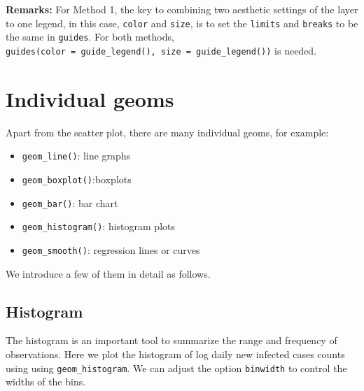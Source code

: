 \documentclass[]{book}
\newenvironment{Shaded}{\begin{snugshade}}{\end{snugshade}}
\newcommand{\KeywordTok}[1]{\textcolor[rgb]{0.13,0.29,0.53}{\textbf{#1}}}
\newcommand{\DataTypeTok}[1]{\textcolor[rgb]{0.13,0.29,0.53}{#1}}
\newcommand{\DecValTok}[1]{\textcolor[rgb]{0.00,0.00,0.81}{#1}}
\newcommand{\StringTok}[1]{\textcolor[rgb]{0.31,0.60,0.02}{#1}}
\newcommand{\CommentTok}[1]{\textcolor[rgb]{0.56,0.35,0.01}{\textit{#1}}}
\newcommand{\OperatorTok}[1]{\textcolor[rgb]{0.81,0.36,0.00}{\textbf{#1}}}
\newcommand{\NormalTok}[1]{#1}
\providecommand{\tightlist}{%
  \setlength{\itemsep}{0pt}\setlength{\parskip}{0pt}}
\begin{document}
\textbf{Remarks:} For Method 1, the key to combining two aesthetic
settings of the layer to one legend, in this case, \texttt{color} and
\texttt{size}, is to set the \texttt{limits} and \texttt{breaks} to be
the same in \texttt{guides}. For both methods,
\texttt{guides(color\ =\ guide\_legend(),\ size\ =\ guide\_legend())} is
needed.

\section{Individual geoms}\label{individual-geoms}

Apart from the scatter plot, there are many individual geoms, for
example:

\begin{itemize}
\tightlist
\item
  \texttt{geom\_line()}: line graphs
\item
  \texttt{geom\_boxplot()}:boxplots
\item
  \texttt{geom\_bar()}: bar chart
\item
  \texttt{geom\_histogram()}: histogram plots
\item
  \texttt{geom\_smooth()}: regression lines or curves
\end{itemize}

We introduce a few of them in detail as follows.

\subsection{Histogram}\label{histogram}

The histogram is an important tool to summarize the range and frequency
of observations. Here we plot the histogram of log daily new infected
cases counts using using \texttt{geom\_histogram}. We can adjust the
option \texttt{binwidth} to control the widths of the bins.

\begin{Shaded}
\end{Shaded}
\end{document}
